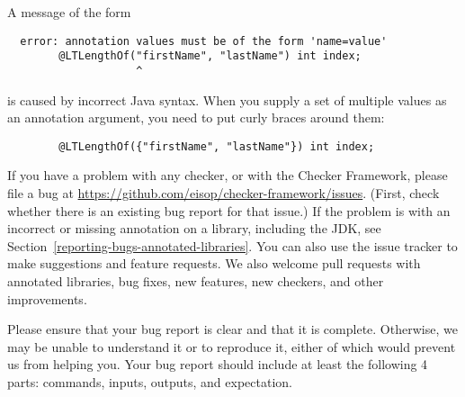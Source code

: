 
A message of the form

\begin{Verbatim}
  error: annotation values must be of the form 'name=value'
        @LTLengthOf("firstName", "lastName") int index;
                    ^
\end{Verbatim}

\noindent
is caused by incorrect Java syntax.  When you supply a set of multiple
values as an annotation argument, you need to put curly braces around them:

\begin{Verbatim}
        @LTLengthOf({"firstName", "lastName"}) int index;
\end{Verbatim}



If you have a problem with any checker, or with the Checker Framework,
please file a bug at
\url{https://github.com/eisop/checker-framework/issues}.
(First, check whether there is an existing bug report for that issue.)
If the problem is with an incorrect or missing annotation on a library,
including the JDK, see Section~\ref{reporting-bugs-annotated-libraries}.
You can also use the issue tracker to make suggestions and feature
requests.  We also welcome pull requests with annotated libraries, bug
fixes, new features, new checkers, and other improvements.

Please ensure that your bug report is clear and that it is complete.
Otherwise, we may be unable to understand it or to reproduce it, either of
which would prevent us from helping you.  Your bug report should include at
least the following 4 parts: commands, inputs, outputs, and expectation.

